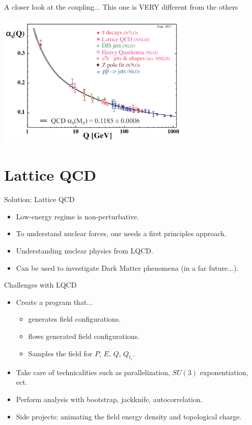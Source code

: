 \documentclass[10pt]{beamer}
\begin{document}
\begin{frame}{A closer look at the coupling...}
	This one is VERY different from the others
	\begin{center}
	\includegraphics[width=0.7\textwidth]{figures/qcd_coupling.png}
	\end{center}
\end{frame}

\section{Lattice QCD}

\begin{frame}{Solution: Lattice QCD}
	\begin{itemize}%
		\item Low-energy regime is non-perturbative.
		\item To understand nuclear forces, one needs a first principles approach.
		\item Understanding nuclear physics from LQCD.
		\item Can be used to investigate Dark Matter phenomena (in a far future...).
	\end{itemize}
\end{frame}

\begin{frame}{Challenges with LQCD}
	\begin{itemize}%
		\item Create a program that...
		\begin{itemize}%
			\item generates field configurations.
			\item flows generated field configurations.
			\item Samples the field for $P$, $E$, $Q$, $Q_{t_e}$.
		\end{itemize}
		\item Take care of technicalities such as parallelization, $SU(3)$ exponentiation, ect.
		\item Perform analysis with bootstrap, jackknife, autocorrelation.
		\item Side projects: animating the field energy density and topological charge.
	\end{itemize}
\end{frame}
\end{document}
